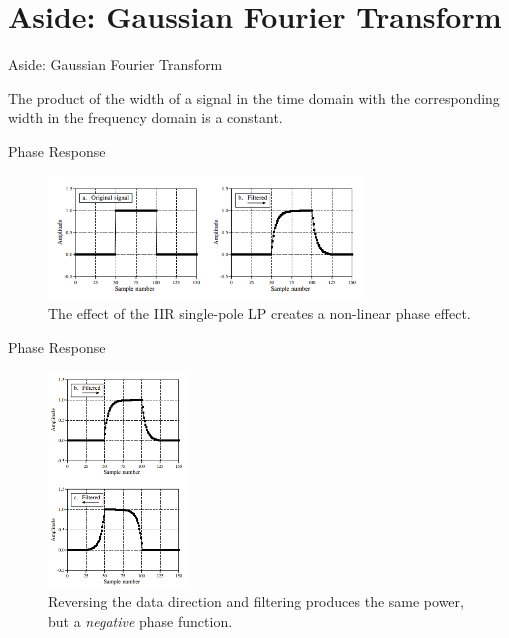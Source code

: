 \documentclass{beamer}
\begin{document}
\section{Aside: Gaussian Fourier Transform}

\begin{frame}{Aside: Gaussian Fourier Transform}
\begin{tcolorbox}[colback=white,colframe=red!40!blue,title=Uncertainty principle for bandwidth]
\alert{The product of the width of a signal in the time domain with the corresponding width in the frequency domain is a constant.
}
\end{tcolorbox}
\end{frame}

\begin{frame}{Phase Response}
\small
\begin{figure}
\centering
\includegraphics[width=0.75\textwidth]{figures/phase2.png}
\caption{\label{fig:phase2} The effect of the IIR single-pole LP creates a non-linear phase effect.}
\end{figure}
\end{frame}

\begin{frame}{Phase Response}
\small
\begin{figure}
\centering
\includegraphics[width=0.33\textwidth]{figures/phase3.png}
\caption{\label{fig:phase3} Reversing the data direction and filtering produces the same power, but a \textit{negative} phase function.}
\end{figure}
\end{frame}
\end{document}

